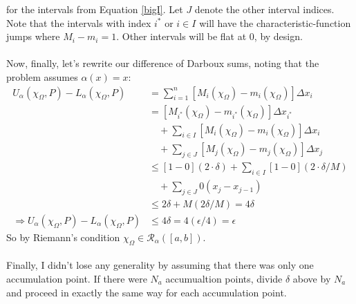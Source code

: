 \documentclass[12pt]{article}
\theoremstyle{plain}
\theoremstyle{definition}
\theoremstyle{remark}
\begin{document}
\begin{enumerate}
    for the intervals from Equation
    \ref{bigI}. Let $J$ denote the other interval 
    indices. Note that the intervals with index $i^*$
    or $i\in I$ will have the characteristic-function 
    jumps where $M_i - m_i = 1$. Other intervals will
    be flat at 0, by design.
    \\
    \\
    Now, finally, let's rewrite our difference
    of Darboux sums, noting that the problem assumes
    $\alpha(x)=x$:
    \begin{align*}
        U_\alpha(\chi_\Omega, P) - 
            L_\alpha(\chi_\Omega, P) &=
            \sum^n_{i=1} [M_i(\chi_\Omega) 
            - m_i(\chi_\Omega)] \Delta x_i \\
        &=  [M_{i^*}(\chi_\Omega) - m_{i^*}(\chi_\Omega)]
            \Delta x_{i^*} \\
        &\quad +
            \sum_{i\in I}[M_{i}(\chi_\Omega) - m_{i}(\chi_\Omega)]
                \Delta x_i \\
        &\quad +
            \sum_{j\in J}[M_{j}(\chi_\Omega) - m_{j}(\chi_\Omega)]
                \Delta x_j \\
        &\leq [1 - 0]
            \left(2\cdot\delta\right) 
         +
            \sum_{i\in I}[1-0]
            \left(2\cdot\delta/M\right) \\
        &\quad +
            \sum_{j\in J} 0
                (x_j - x_{j-1}) \\
        &\leq 2\delta + M (2\delta/M) = 4\delta\\
        \Rightarrow U_\alpha(\chi_\Omega, P) - 
            L_\alpha(\chi_\Omega, P) &\leq
            4\delta = 4(\epsilon/4) = \epsilon
    \end{align*}
    So by Riemann's condition $\chi_\Omega \in 
    \mathscr{R}_\alpha([a,b])$.
    \\
    \\
    Finally, I didn't lose any generality by assuming that
    there was only one accumulation point.  If there
    were $N_a$ accumualtion points, divide $\delta$ 
    above by $N_a$ and proceed in exactly the same way
    for each accumulation point.  





  
    




\end{enumerate}





% 
\end{document}
